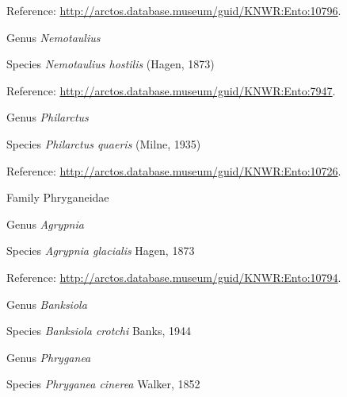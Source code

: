\documentclass[9pt, article]{memoir}
\begin{document}
\begin{multicols}{2}
\vspace{6pt}Reference: 
\url{http://arctos.database.museum/guid/KNWR:Ento:10796}.

\vspace{6pt}\noindent\hspace{30pt}Genus \textit{Nemotaulius}


\vspace{6pt}\noindent\hspace{36pt}Species \textit{Nemotaulius hostilis} (Hagen, 1873)


\vspace{6pt}Reference: 
\url{http://arctos.database.museum/guid/KNWR:Ento:7947}.

\vspace{6pt}\noindent\hspace{30pt}Genus \textit{Philarctus}


\vspace{6pt}\noindent\hspace{36pt}Species \textit{Philarctus quaeris} (Milne, 1935)


\vspace{6pt}Reference: 
\url{http://arctos.database.museum/guid/KNWR:Ento:10726}.

\vspace{6pt}\noindent\hspace{24pt}Family Phryganeidae


\vspace{6pt}\noindent\hspace{30pt}Genus \textit{Agrypnia}


\vspace{6pt}\noindent\hspace{36pt}Species \textit{Agrypnia glacialis} Hagen, 1873


\vspace{6pt}Reference: 
\url{http://arctos.database.museum/guid/KNWR:Ento:10794}.

\vspace{6pt}\noindent\hspace{30pt}Genus \textit{Banksiola}


\vspace{6pt}\noindent\hspace{36pt}Species \textit{Banksiola crotchi} Banks, 1944


\vspace{6pt}\noindent\hspace{30pt}Genus \textit{Phryganea}


\vspace{6pt}\noindent\hspace{36pt}Species \textit{Phryganea cinerea} Walker, 1852



\end{multicols}
\end{document}
